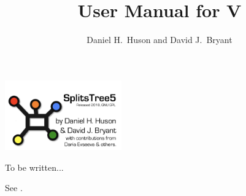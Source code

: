 \documentclass[11pt]{article}
\title{User Manual for \SplitsTree V\VERSION}
\author{Daniel H.~Huson and David J.~Bryant}
\begin{document}

\maketitle

\begin{center}
\includegraphics[height=3cm]{../../src/splitstree5/resources/images/Splitstree5-splash.png}
\end{center}

\tableofcontents

To be written...

See \cite{HusonBryant2006}.





\printindex
\end{document}
